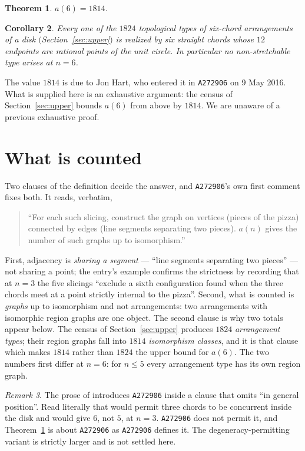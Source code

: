 \documentclass[11pt]{amsart}
\newtheorem{theorem}{Theorem}
\newtheorem{corollary}[theorem]{Corollary}
\theoremstyle{definition}
\theoremstyle{remark}
\newtheorem{remark}[theorem]{Remark}
\begin{document}
\begin{theorem}\label{thm:main}
$a(6)=1814$.
\end{theorem}

\begin{corollary}\label{cor:stretch}
Every one of the $1824$ topological types of six-chord arrangements of a disk
$($Section~\textup{\ref{sec:upper}}$)$ is realized by six straight chords whose $12$
endpoints are rational points of the unit circle. In particular no non-stretchable type
arises at $n=6$.
\end{corollary}

The value $1814$ is due to Jon Hart, who entered it in \texttt{A272906} on 9 May 2016.
What is supplied here is an exhaustive argument: the census of
Section~\ref{sec:upper} bounds $a(6)$ from above by $1814$. We are unaware of a previous
exhaustive proof.

\section{What is counted}\label{sec:counted}

Two clauses of the definition decide the answer, and \texttt{A272906}'s own first comment
fixes both. It reads, verbatim,
\begin{quote}
``For each such slicing, construct the graph on vertices (pieces of the pizza) connected by
edges (line segments separating two pieces). $a(n)$ gives the number of such graphs up to
isomorphism.''
\end{quote}
First, adjacency is \emph{sharing a segment} --- ``line segments separating two pieces'' ---
not sharing a point; the entry's example confirms the strictness by recording that at $n=3$
the five slicings ``exclude a sixth configuration found when the three chords meet at a point
strictly internal to the pizza''. Second, what is counted is \emph{graphs} up to
isomorphism and not arrangements: two arrangements with isomorphic region graphs are one
object. The second clause is why two totals appear below. The census of
Section~\ref{sec:upper} produces $1824$ \emph{arrangement types}; their region graphs fall
into $1814$ \emph{isomorphism classes}, and it is that clause which makes $1814$ rather
than $1824$ the upper bound for $a(6)$. The two numbers first differ at $n=6$: for
$n\le5$ every arrangement type has its own region graph.

\begin{remark}\label{rem:reading}
The prose of \cite{CKS} introduces \texttt{A272906} inside a clause that omits ``in
general position''. Read literally that would permit three chords to be concurrent inside
the disk and would give $6$, not $5$, at $n=3$. \texttt{A272906} does not permit it, and
Theorem~\ref{thm:main} is about \texttt{A272906} as \texttt{A272906} defines it. The
degeneracy-permitting variant is strictly larger and is not settled here.
\end{remark}
\end{document}
